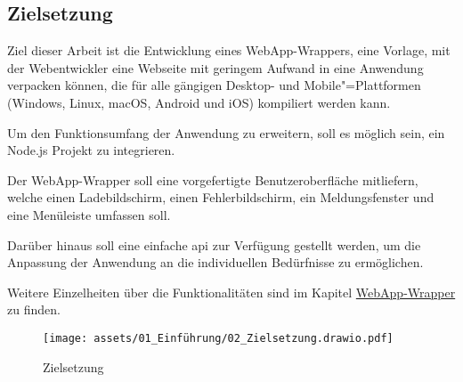 \subsection{Zielsetzung}

Ziel dieser Arbeit ist die Entwicklung eines WebApp-Wrappers, eine Vorlage, mit der Webentwickler eine Webseite mit geringem Aufwand in eine Anwendung verpacken können, die für alle gängigen Desktop- und Mobile"=Plattformen (Windows, Linux, macOS, Android und iOS) kompiliert werden kann.

Um den Funktionsumfang der Anwendung zu erweitern, soll es möglich sein, ein Node.js Projekt zu integrieren.

Der WebApp-Wrapper soll eine vorgefertigte Benutzeroberfläche mitliefern, welche einen Ladebildschirm, einen Fehlerbildschirm, ein Meldungsfenster und eine Menüleiste umfassen soll.

Darüber hinaus soll eine einfache \ac{api} zur Verfügung gestellt werden, um die Anpassung der Anwendung an die individuellen Bedürfnisse zu ermöglichen.

Weitere Einzelheiten über die Funktionalitäten sind im Kapitel \hyperref[sec:WebApp-Wrapper]{WebApp-Wrapper} zu finden.

\begin{figure}[H]
    \centering
    \texttt{[image: assets/01\_Einführung/02\_Zielsetzung.drawio.pdf]}
    \caption[Zielsetzung]{Zielsetzung}
\end{figure}
